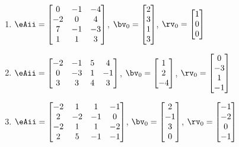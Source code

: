 \begin{exercise}
\begin{enumerate}
\item \(\eAii=\begin{bmatrix} 0&-1&-4
\\-2&0&4
\\7&-1&-3
\\1&1&3 \end{bmatrix}\),
\(\bv_{\arabic{enumii}}=\begin{bmatrix} 2
\\3
\\1
\\3 \end{bmatrix}\),
\(\rv_{\arabic{enumii}}=\begin{bmatrix} 1
\\0
\\0 \end{bmatrix}\)

\item \(\eAii=\begin{bmatrix} -2&-1&5&4
\\0&-3&1&-1
\\3&3&4&3 \end{bmatrix}\),
\(\bv_{\arabic{enumii}}=\begin{bmatrix} 1
\\2
\\-4 \end{bmatrix}\),
\(\rv_{\arabic{enumii}}=\begin{bmatrix} 0
\\-3
\\1
\\-1 \end{bmatrix}\)

\item \(\eAii=\begin{bmatrix} -2&1&1&-1
\\2&-2&-1&0
\\-2&1&1&-2
\\2&5&-1&-1 \end{bmatrix}\),
\(\bv_{\arabic{enumii}}=\begin{bmatrix} 2
\\-1
\\3
\\0 \end{bmatrix}\),
\(\rv_{\arabic{enumii}}=\begin{bmatrix} -1
\\-2
\\0
\\-1 \end{bmatrix}\)


\end{enumerate}
\end{exercise}
